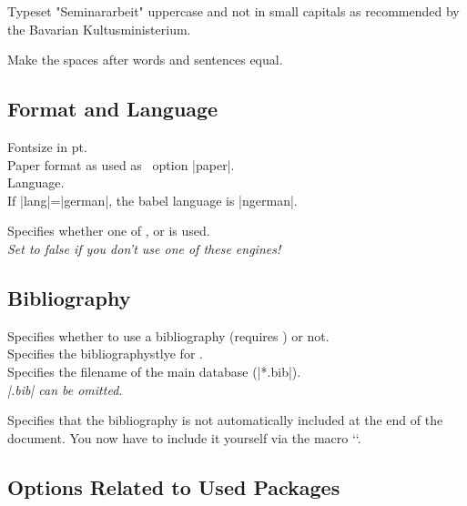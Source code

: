 Typeset "Seminararbeit" uppercase and not in small capitals as recommended
by the Bavarian Kultusministerium.

Make the spaces after words and sentences equal.



\subsection{Format and Language}

Fontsize in pt. \\

Paper format as used as \report\ option |paper|. \\

Language. \\ If |lang|=|german|, the babel language is |ngerman|.

Specifies whether one of ,  or  is used. \\
\emph{Set to false if you don't use one of these engines!}



\subsection{Bibliography}

Specifies whether to use a bibliography (requires ) or not. \\

Specifies the bibliographystlye for . \\

Specifies the filename of the main  database (|*.bib|). \\
\emph{|.bib| can be omitted.}

Specifies that the bibliography is not automatically included at the end
of the document. You now have to include it yourself via the macro
`\makebib`.



\subsection{Options Related to Used Packages}

